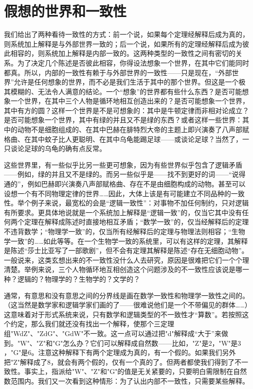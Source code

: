 \section{假想的世界和一致性}

我们给出了两种看待一致性的方式：前一个说，如果每个定理经解释后成为真的，则系统加上解释是与外部世界一致的；后一个说，如果所有的定理经解释后成为彼此相容的，则系统加上解释是内部一致的。这两种类型的一致性之间有密切的关系。为了决定几个陈述是否彼此相容，你得设法想象一个世界，在其中它们能同时都真。所以，内部的一致性有赖于与外部世界的一致性——只是现在，“外部世界”允许是任何想象的世界，而不必是我们生活于其中的那个世界。但这是一个极其模糊的、无法令人满意的结论。一个“想象”的世界都有些什么东西？是否可能想象一个世界，在其中三个人物是循环地相互创造出来的？是否可能想象一个世界，其中有方的圆？这样一个世界是不是可想象的：其中是牛顿定律而非相对论成立？是否可能想象一个世界，其中有绿的并且又不是绿的东西？或者这样一些世界：其中的动物不是细胞组成的、在其中巴赫在腓特烈大帝的主题上即兴演奏了八声部赋格曲、在其中蚊子比人更聪明、在其中乌龟能踢足球——或谈论足球？当然了，一只谈论足球的乌龟的确有点反常。

这些世界里，有一些似乎比另一些更可想象，因为有些世界似乎包含了逻辑矛盾——例如，绿的并且又不是绿的。而另一些似乎是——找不到更好的词——“说得通的”，例如巴赫即兴演奏八声部赋格曲、存在不是由细胞构成的动物。甚至可以设想一个有不同物理定律的世界……因此，大体上该是有可能建立不同品种的一致性。举个例子来说，最宽松的会是“逻辑一致性”：对事物不加任何制约，只对逻辑有所要求。更具体地说就是一个系统加上解释是“逻辑一致”的，仅当它其中没有任何两个定理在解释成陈述时直接地相互矛盾；“数学一致”的，仅当经解释后的定理不违背数学；“物理学一致”的，仅当所有经解释后的定理与物理法则相容；“生物学一致”的……如此等等。在一个生物学一致的系统里，可以有这样的定理，其解释是陈述“莎士比亚写了一部歌剧”，但不会有定理其解释是陈述“存在无细胞动物”。一般说来，这类玄想出来的不一致性没什么人去研究，原因是很难把它们一个个理清楚。举例来说，三个人物循环地互相创造这个问题涉及的不一致性应该说是哪一种？逻辑的？物理学的？生物学的？文学的？

通常，有意思和没有意思之间的分界线是画在数学一致性和物理学一致性之间的。（这当然是数学家和逻辑学家们画的了——很难说他们是一个不带偏见的群体……）这意味着对于形式系统来说，只有数学和逻辑类型的不一致性才“算数”。若按照这个约定，那么我们就还没有找出一个解释，使那个三定理组"WdZ"、"ZdG"、"GdW"不一致。这一点可以通过把"d"解释成“大于”来做到。"W"、"Z"和"G"怎么办？它们可以解释成自然数——比如，"Z"是$2$，"W"是$3$，"G"是$6$。注意这种解释下有两个定理成为真的，有一个假的。如果我们另外把"Z"解释成了$8$，就会有两个假的，仅有一个真的了。但两者都使我们得到了不一致性。事实上，指派给"W"、"Z"和"G"的值是无关紧要的，只要明白需限制在自然数范围内。我们又一次看到这种情形：为了认出内部不一致性，只需要某些解释。

